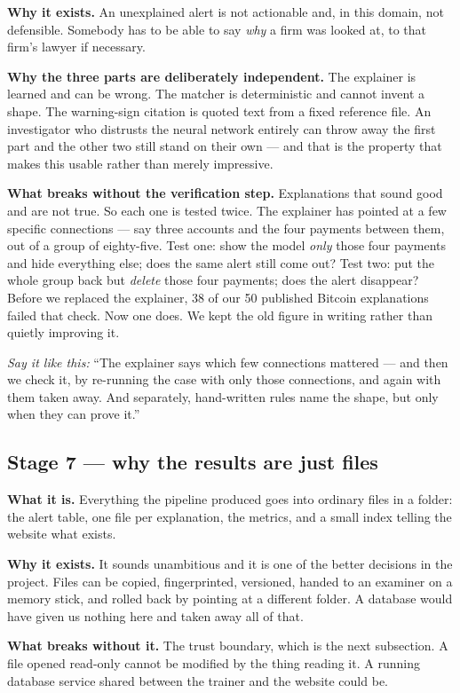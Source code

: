 \documentclass[11pt,a4paper]{article}
\newcommand{\aloud}[1]{\par\smallskip\noindent\textit{\textcolor{accent}{Say
it like this:}} ``#1''\par\smallskip}
\begin{document}
\textbf{Why it exists.} An unexplained alert is not actionable and, in this
domain, not defensible. Somebody has to be able to say \emph{why} a firm was
looked at, to that firm's lawyer if necessary.

\textbf{Why the three parts are deliberately independent.} The explainer is
learned and can be wrong. The matcher is deterministic and cannot invent a
shape. The warning-sign citation is quoted text from a fixed reference file.
An investigator who distrusts the neural network entirely can throw away the
first part and the other two still stand on their own --- and that is the
property that makes this usable rather than merely impressive.

\textbf{What breaks without the verification step.} Explanations that sound
good and are not true. So each one is tested twice. The explainer has pointed
at a few specific connections --- say three accounts and the four payments
between them, out of a group of eighty-five. Test one: show the model
\emph{only} those four payments and hide everything else; does the same alert
still come out? Test two: put the whole group back but \emph{delete} those four
payments; does the alert disappear? Before we replaced the explainer, 38 of our 50 published
Bitcoin explanations failed that check. Now one does. We kept the old figure in
writing rather than quietly improving it.

\aloud{The explainer says which few connections mattered --- and then we check
it, by re-running the case with only those connections, and again with them
taken away. And separately, hand-written rules name the shape, but only when
they can prove it.}

\subsection{Stage 7 --- why the results are just files}

\textbf{What it is.} Everything the pipeline produced goes into ordinary files
in a folder: the alert table, one file per explanation, the metrics, and a
small index telling the website what exists.

\textbf{Why it exists.} It sounds unambitious and it is one of the better
decisions in the project. Files can be copied, fingerprinted, versioned,
handed to an examiner on a memory stick, and rolled back by pointing at a
different folder. A database would have given us nothing here and taken away
all of that.

\textbf{What breaks without it.} The trust boundary, which is the next
subsection. A file opened read-only cannot be modified by the thing reading it.
A running database service shared between the trainer and the website could be.
\end{document}
